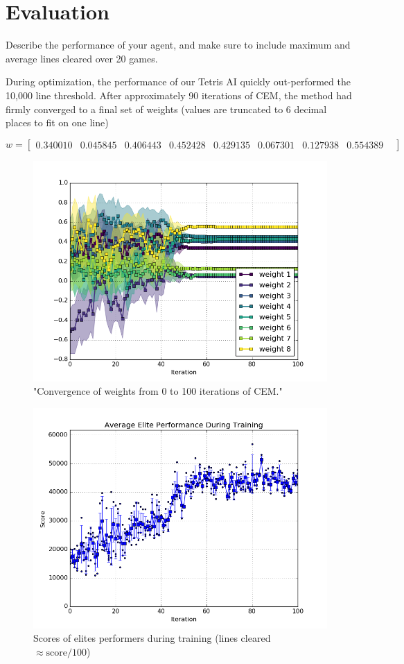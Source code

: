 \documentclass[12pt,letterpaper]{article}
\begin{document}
\section{Evaluation}
Describe the performance of your agent, and make sure to include maximum and average lines cleared over 20 games.

During optimization, the performance of our Tetris AI quickly out-performed the 10,000 line threshold. After approximately 90 iterations of CEM, the method had firmly converged to a final set of weights (values are truncated to 6 decimal places to fit on one line)

\[w = \begin{bmatrix}
    0.340010 &
    0.045845 &
    0.406443 &
    0.452428 &
    0.429135 &
    0.067301 &
    0.127938 &
    0.554389 &
  \end{bmatrix}\]

\begin{figure}[h!]
  \centering
  \includegraphics[width=0.7\linewidth]{weights.png}
  \caption{"Convergence of weights from 0 to 100 iterations of CEM."}
\end{figure}

\begin{figure}[h!]
  \centering
  \includegraphics[width=0.7\linewidth]{training_scores.png}
  \caption{Scores of elites performers during training (lines cleared $\approx \text{score}/100$)}
\end{figure}
\end{document}
